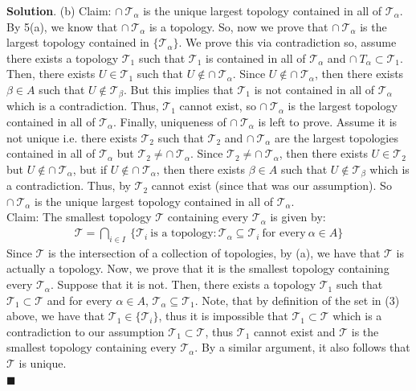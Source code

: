 \documentclass[12pt]{article}
\renewcommand{\=}[1]{\stackrel{#1}{=}} %
\providecommand{\T}{\mathcal{T}}
\theoremstyle{definition}
\newenvironment{s}{%
        \begin{trivlist} \item \textbf{Solution}. }{%
            \hspace*{\fill} $\blacksquare$\end{trivlist}}%
\begin{document}
\begin{s}
    (b) Claim: $\cap\:\T_{\alpha}$ is the unique largest topology contained in all of $\T_{\alpha}$. By 5(a), we know that
    $\cap\:\T_{\alpha}$ is a topology. So, now we prove that $\cap\:\T_{\alpha}$ is the largest topology contained
    in $\{\T_{\alpha}\}$. We prove this via contradiction so, assume there exists a topology $\T_1$ such that
    $\T_1$ is contained in all of $\T_{\alpha}$ and $\cap\:T_{\alpha} \subset \T_1$. Then, there exists
    $U\in\T_1$ such that $U\not\in\cap\:\T_{\alpha}$. Since $U\not\in\cap\:\T_{\alpha}$, then there exists $\beta\in A$
    such that $U\not\in\T_{\beta}$. But this implies that $\T_1$ is not contained in all of $\T_{\alpha}$ which is a contradiction.
    Thus, $\T_1$ cannot exist, so $\cap\:\T_{\alpha}$ is the largest topology contained in all of $\T_{\alpha}$. Finally,
    uniqueness of $\cap\:\T_{\alpha}$ is left to prove. Assume it is not unique i.e. there exists $\T_2$ such that
    $\T_2$ and $\cap\:\T_{\alpha}$ are the largest topologies contained in all of $\T_{\alpha}$ but $\T_2\neq\cap\:\T_{\alpha}$.
    Since $\T_2\neq\cap\:\T_{\alpha}$, then there exists $U\in\T_2$ but $U\not\in\cap\:\T_{\alpha}$, 
    but if $U\not\in\cap\:\T_{\alpha}$, then there exists $\beta\in A$ such that $U\not\in\T_{\beta}$ which is a contradiction.
    Thus, by $\T_2$ cannot exist (since that was our assumption). So $\cap\:\T_{\alpha}$ is the unique largest topology
    contained in all of $\T_{\alpha}$.\\
    Claim: The smallest topology $\T$ containing every $\T_{\alpha}$ is given by:
    \begin{align}
        \T = \bigcap_{i\in I}\: \{\T_i\:\text{is a topology}: \T_{\alpha} \subseteq \T_i\:\text{for every}\:\alpha\in A\} 
    \end{align}
    Since $\T$ is the intersection of a collection of topologies, by (a), we have that $\T$ is actually a topology. Now, we
    prove that it is the smallest topology containing every $\T_{\alpha}$. Suppose that it is not. Then, there exists a topology
    $\T_1$ such that $\T_1\subset\T$ and for every $\alpha\in A$, $\T_{\alpha}\subseteq\T_1$. Note, that by definition of the set
    in (3) above, we have that $\T_1\in\{\T_i\}$, thus it is impossible that $\T_1 \subset \T$ which is a contradiction to our
    assumption $\T_1 \subset \T$, thus $\T_1$ cannot exist and $\T$ is the smallest topology containing every $\T_{\alpha}$. By
    a similar argument, it also follows that $\T$ is unique.
    \\


\end{s}
\end{document}
